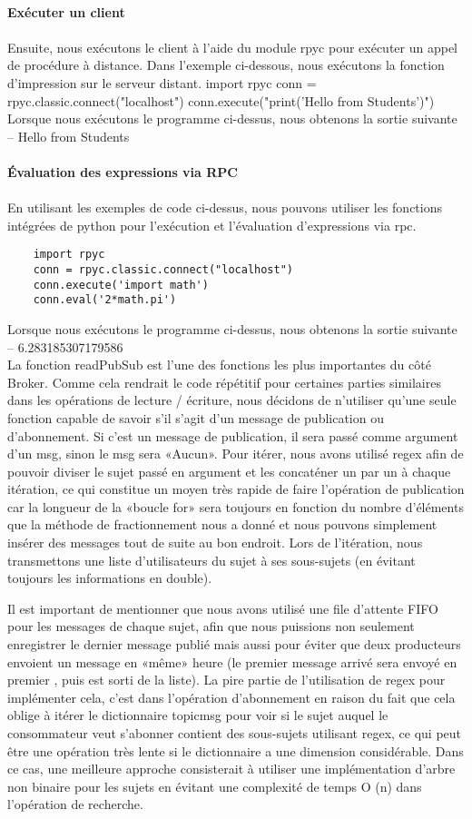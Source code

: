 \textbf{\\Exécuter un client}\\\\
Ensuite, nous exécutons le client à l'aide du module rpyc pour exécuter un appel de procédure à distance. Dans l'exemple ci-dessous, nous exécutons la fonction d'impression sur le serveur distant.
import rpyc
conn = rpyc.classic.connect("localhost")
conn.execute("print('Hello from Students')")
Lorsque nous exécutons le programme ci-dessus, nous obtenons la sortie suivante –
Hello from Students\\
\textbf{\\Évaluation des expressions via RPC}\\\\
En utilisant les exemples de code ci-dessus, nous pouvons utiliser les fonctions intégrées de python pour l'exécution et l'évaluation d'expressions via rpc.

\begin{verbatim}
	import rpyc
	conn = rpyc.classic.connect("localhost")
	conn.execute('import math')
	conn.eval('2*math.pi')
\end{verbatim}
Lorsque nous exécutons le programme ci-dessus, nous obtenons la sortie suivante –
6.283185307179586\\

La fonction readPubSub est l'une des fonctions les plus importantes du côté Broker. Comme cela rendrait le code répétitif pour certaines parties similaires dans les opérations de lecture / écriture, nous décidons de n'utiliser qu'une seule fonction capable de savoir s'il s'agit d'un message de publication ou d'abonnement. Si c'est un message de publication, il sera passé comme argument d'un msg, sinon le msg sera «Aucun». Pour itérer, nous avons utilisé regex afin de pouvoir diviser le sujet passé en argument et les concaténer un par un à chaque itération, ce qui constitue un moyen très rapide de faire l'opération de publication car la longueur de la «boucle for» sera toujours en fonction du nombre d'éléments que la méthode de fractionnement nous a donné et nous pouvons simplement insérer des messages tout de suite au bon endroit. Lors de l'itération, nous transmettons une liste d'utilisateurs du sujet à ses sous-sujets (en évitant toujours les informations en double).

Il est important de mentionner que nous avons utilisé une file d'attente FIFO pour les messages de chaque sujet, afin que nous puissions non seulement enregistrer le dernier message publié mais aussi pour éviter que deux producteurs envoient un message en «même» heure (le premier message arrivé sera envoyé en premier , puis est sorti de la liste). La pire partie de l'utilisation de regex pour implémenter cela, c'est dans l'opération d'abonnement en raison du fait que cela oblige à itérer le dictionnaire topicmsg pour voir si le sujet auquel le consommateur veut s'abonner contient des sous-sujets utilisant regex, ce qui peut être une opération très lente si le dictionnaire a une dimension considérable. Dans ce cas, une meilleure approche consisterait à utiliser une implémentation d'arbre non binaire pour les sujets en évitant une complexité de temps O (n) dans l'opération de recherche.\\

